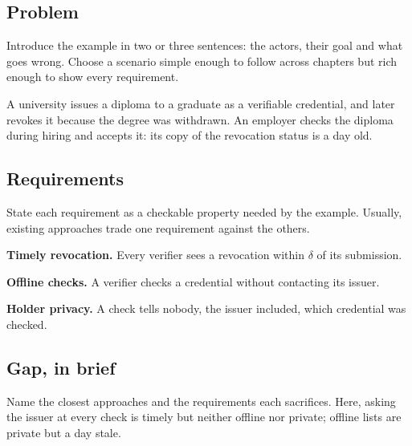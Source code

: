\subsection[Problem]{Problem\skimmark}\label{app:chapters:problem}
Introduce the example in two or three sentences: the actors, their goal and what goes wrong. Choose a scenario simple enough to follow across chapters but rich enough to show every requirement.
\begin{runningexample}
A university issues a diploma to a graduate as a verifiable credential, and later revokes it because the degree was withdrawn. An employer checks the diploma during hiring and accepts it: its copy of the revocation status is a day old.
\end{runningexample}

\subsection[Requirements]{Requirements\skimmark}\label{app:chapters:requirements}
State each requirement as a checkable property needed by the example. Usually, existing approaches trade one requirement against the others.
\begin{requirements}
  \item\label{req:guide:timely} \textbf{Timely revocation.} Every verifier sees a revocation within $\delta$ of its submission.
  \item\label{req:guide:offline} \textbf{Offline checks.} A verifier checks a credential without contacting its issuer.
  \item\label{req:guide:private} \textbf{Holder privacy.} A check tells nobody, the issuer included, which credential was checked.
\end{requirements}

\subsection{Gap, in brief}\label{app:chapters:introgap}
Name the closest approaches and the requirements each sacrifices. Here, asking the issuer at every check is timely but neither offline nor private; offline lists are private but a day stale.


